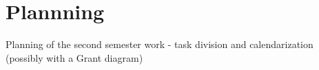 \chapter{Plannning}
\label{chapter:planning}

{\color{red}
Planning of the second semester work - task division and calendarization (possibly with a Grant diagram)
}